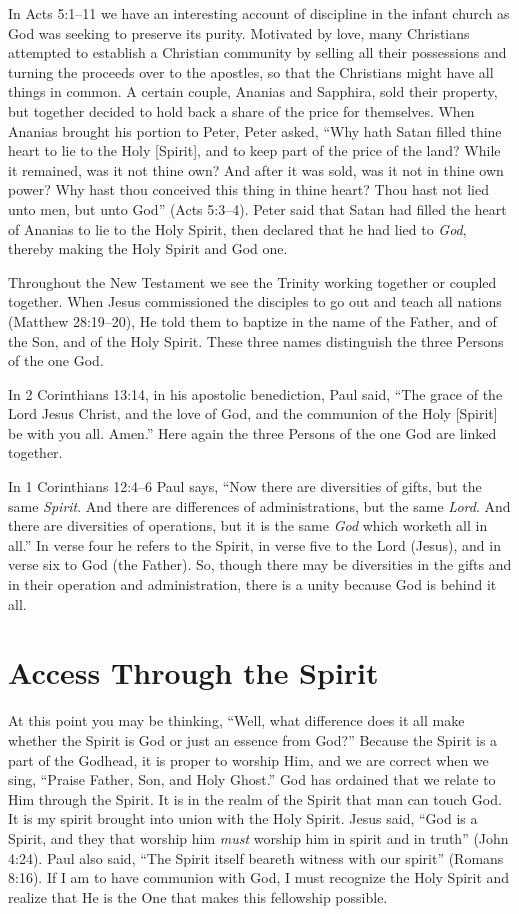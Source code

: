 In Acts 5:1–11 we have an interesting account of discipline
in the infant church as God was seeking to preserve
its purity. Motivated by love, many Christians attempted
to establish a Christian community by selling all their possessions
and turning the proceeds over to the apostles, so
that the Christians might have all things in common. A certain
couple, Ananias and Sapphira, sold their property, but
together decided to hold back a share of the price for themselves.
When Ananias brought his portion to Peter, Peter
asked, “Why hath Satan filled thine heart to lie to the Holy
[Spirit], and to keep part of the price of the land? While it
remained, was it not thine own? And after it was sold, was
it not in thine own power? Why hast thou conceived this
thing in thine heart? Thou hast not lied unto men, but unto
God” (Acts 5:3–4). Peter said that Satan had filled the heart
of Ananias to lie to the Holy Spirit, then declared that he
had lied to \emph{God}, thereby making the Holy Spirit and God
one.

Throughout the New Testament we see the Trinity working
together or coupled together. When Jesus commissioned
the disciples to go out and teach all nations (Matthew
28:19–20), He told them to baptize in the name of the Father,
and of the Son, and of the Holy Spirit. These three names
distinguish the three Persons of the one God.

In 2 Corinthians 13:14, in his apostolic benediction, Paul
said, “The grace of the Lord Jesus Christ, and the love of
God, and the communion of the Holy [Spirit] be with you
all. Amen.” Here again the three Persons of the one God are
linked together.

In 1 Corinthians 12:4–6 Paul says, “Now there are diversities
of gifts, but the same \emph{Spirit}. And there are differences
of administrations, but the same \emph{Lord}. And there are diversities
of operations, but it is the same \emph{God} which worketh
all in all.” In verse four he refers to the Spirit, in verse five
to the Lord (Jesus), and in verse six to God (the Father).
So, though there may be diversities in the gifts and in their
operation and administration, there is a unity because God
is behind it all.


\section*{Access Through the Spirit}

At this point you may be thinking, “Well, what difference
does it all make whether the Spirit is God or just an
essence from God?” Because the Spirit is a part of the Godhead,
it is proper to worship Him, and we are correct when
we sing, “Praise Father, Son, and Holy Ghost.” God has
ordained that we relate to Him through the Spirit. It is in the
realm of the Spirit that man can touch God. It is my spirit
brought into union with the Holy Spirit. Jesus said, “God
is a Spirit, and they that worship him \emph{must} worship him in
spirit and in truth” (John 4:24). Paul also said, “The Spirit
itself beareth witness with our spirit” (Romans 8:16). If I am
to have communion with God, I must recognize the Holy
Spirit and realize that He is the One that makes this fellowship
possible.

